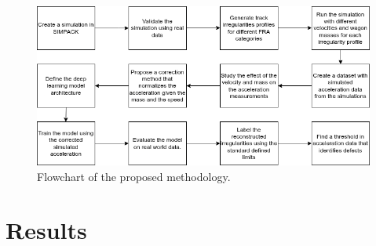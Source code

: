 \begin{figure}[H]
    \centering
    \includegraphics[width=12cm]{Cap3_Methodology/Flowchart/Flowchart.png}
    \caption{Flowchart of the proposed methodology.}
    \label{fig:flowchart}
\end{figure}

\chapter{Results} \label{sec-Results}
